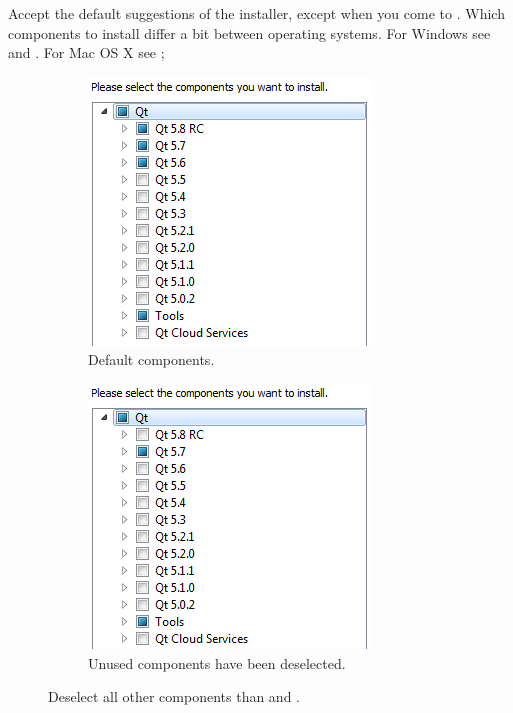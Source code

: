 Accept the default suggestions of the installer, except when you come to . Which components to install differ a bit between operating systems. For Windows see  and . For Mac OS X see ;

\begin{figure} [h] %
\centering
\begin{subfigure}{.5\textwidth}
  \centering
  \includegraphics[width=.9\textwidth]{graphics/qt-setup-win-1.png}
  \caption{Default components.}
\end{subfigure}%
\begin{subfigure}{.5\textwidth}
  \centering
  \includegraphics[width=.9\textwidth]{graphics/qt-setup-win-2.png}
  \caption{Unused components have been deselected.}
\end{subfigure}%
\caption{Deselect all other components than  and .}
\label{fig:qt-setup-win-1}
\end{figure}

